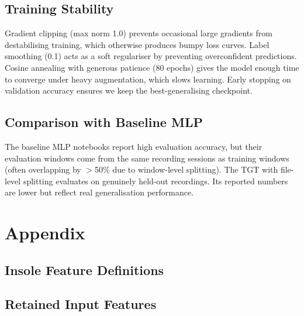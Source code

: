 \documentclass[11pt,a4paper,twocolumn]{article}
\begin{document}
\subsection{Training Stability}

Gradient clipping (max norm 1.0) prevents occasional large gradients from destabilising training, which otherwise produces bumpy loss curves. Label smoothing (0.1) acts as a soft regulariser by preventing overconfident predictions. Cosine annealing with generous patience (80 epochs) gives the model enough time to converge under heavy augmentation, which slows learning. Early stopping on validation accuracy ensures we keep the best-generalising checkpoint.

\subsection{Comparison with Baseline MLP}

The baseline MLP notebooks report high evaluation accuracy, but their evaluation windows come from the same recording sessions as training windows (often overlapping by $>$50\% due to window-level splitting). The TGT with file-level splitting evaluates on genuinely held-out recordings. Its reported numbers are lower but reflect real generalisation performance.


\appendix

\section*{Appendix}

\subsection*{Insole Feature Definitions}



\subsection*{Retained Input Features}


\end{document}

